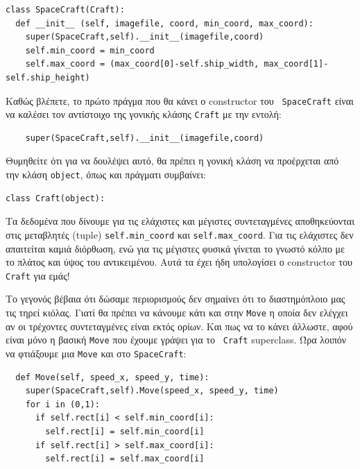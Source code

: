 \begin{verbatim}
class SpaceCraft(Craft):
  def __init__ (self, imagefile, coord, min_coord, max_coord):
    super(SpaceCraft,self).__init__(imagefile,coord)
    self.min_coord = min_coord
    self.max_coord = (max_coord[0]-self.ship_width, max_coord[1]-self.ship_height)
\end{verbatim}

Καθώς βλέπετε, το πρώτο πράγμα που θα κάνει ο constructor του {\tt
SpaceCraft} είναι να καλέσει τον αντίστοιχο της γονικής κλάσης {\tt Craft} με την εντολή:

\begin{verbatim}
    super(SpaceCraft,self).__init__(imagefile,coord)
\end{verbatim}

Θυμηθείτε ότι για να δουλέψει αυτό, θα πρέπει η γονική κλάση να προέρχεται
από την κλάση {\tt object}, όπως και πράγματι συμβαίνει:

\begin{verbatim}
class Craft(object):
\end{verbatim}

Τα δεδομένα που δίνουμε για τις ελάχιστες και μέγιστες συντεταγμένες
αποθηκεύονται στις μεταβλητές (tuple) {\tt self.min\_coord} και
{\tt self.max\_coord}. Για τις ελάχιστες δεν απαιτείται καμιά διόρθωση, ενώ για τις μέγιστες φυσικά γίνεται το γνωστό κόλπο με το πλάτος και ύψος του αντικειμένου. Αυτά τα έχει ήδη υπολογίσει
ο constructor του {\tt Craft} για εμάς!

Το γεγονός βέβαια ότι δώσαμε περιορισμούς δεν σημαίνει ότι το διαστημόπλοιο
 μας τις τηρεί κιόλας. Γιατί θα πρέπει να κάνουμε κάτι και στην {\tt Move} η οποία
δεν ελέγχει αν οι τρέχοντες συντεταγμένες είναι εκτός ορίων. Και πως να το
κάνει άλλωστε, αφού είναι μόνο η βασική {\tt Move} που έχουμε γράψει για το {\tt
Craft}
 superclass. Ώρα λοιπόν να φτιάξουμε μια {\tt Move} και στο {\tt SpaceCraft}:

\begin{verbatim}
  def Move(self, speed_x, speed_y, time):
    super(SpaceCraft,self).Move(speed_x, speed_y, time)
    for i in (0,1):
      if self.rect[i] < self.min_coord[i]:
        self.rect[i] = self.min_coord[i]
      if self.rect[i] > self.max_coord[i]:
        self.rect[i] = self.max_coord[i]
\end{verbatim}


